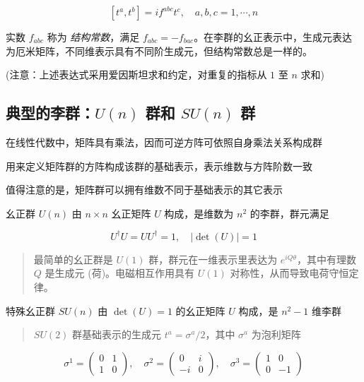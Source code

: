 \begin{equation}
    \left[t^a, t^b\right] = i f^{abc} t^c, \quad a,b,c = 1, \cdots, n
\end{equation}

实数 $f_{abc}$ 称为 \emph{结构常数}，满足 $f_{abc}=-f_{bac}$。在李群的幺正表示中，生成元表达为厄米矩阵，不同维表示具有不同阶生成元，但结构常数总是一样的。

(注意：上述表达式采用爱因斯坦求和约定，对重复的指标从 $1$ 至 $n$ 求和)

\subsection{典型的李群：\texorpdfstring{$U(n)$}{U(n)} 群和 \texorpdfstring{$SU(n)$}{SU(n)} 群}

在线性代数中，矩阵具有乘法，因而可逆方阵可依照自身乘法关系构成群

用来定义矩阵群的方阵构成该群的基础表示，表示维数与方阵阶数一致

值得注意的是，矩阵群可以拥有维数不同于基础表示的其它表示

幺正群 $U(n)$ 由 $n\times n$ 幺正矩阵 $U$ 构成，是维数为 $n^2$ 的李群，群元满足

\begin{equation}
    U^\dagger U = U U^\dagger = 1, \quad |\det(U)|=1
\end{equation}

\begin{quote}
    最简单的幺正群是 $U(1)$ 群，群元在一维表示里表达为 $e^{iQ\theta}$，其中有理数 $Q$ 是生成元 (荷)。电磁相互作用具有 $U(1)$ 对称性，从而导致电荷守恒定律。
\end{quote}

特殊幺正群 $SU(n)$ 由 $\det(U)=1$ 的幺正矩阵 $U$ 构成，是 $n^2 - 1$ 维李群

\begin{quote}
    $SU(2)$ 群基础表示的生成元 $t^a=\sigma^a/2$，其中 $\sigma^a$ 为泡利矩阵
\end{quote}

\begin{equation}
    \sigma^1 =
\begin{pmatrix}
    0 & 1 \\
    1 & 0
\end{pmatrix}, \quad
\sigma^2 =
\begin{pmatrix}
    0 & i \\
    -i & 0
\end{pmatrix}, \quad
\sigma^3 =
\begin{pmatrix}
    1 & 0 \\
    0 & -1
\end{pmatrix}
\end{equation}

